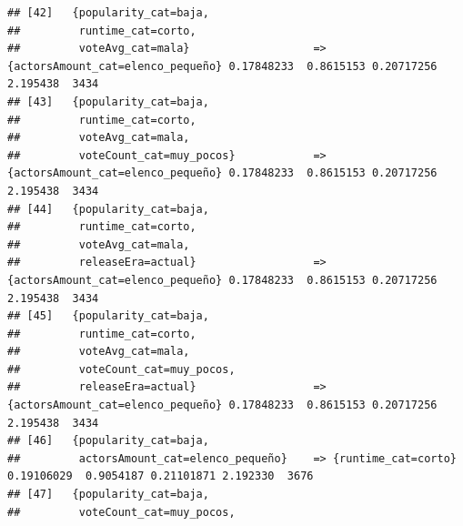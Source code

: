 \documentclass[
]{article}
\begin{document}
\begin{verbatim}
## [42]   {popularity_cat=baja,                                                                                                    
##         runtime_cat=corto,                                                                                                      
##         voteAvg_cat=mala}                   => {actorsAmount_cat=elenco_pequeño} 0.17848233  0.8615153 0.20717256 2.195438  3434
## [43]   {popularity_cat=baja,                                                                                                    
##         runtime_cat=corto,                                                                                                      
##         voteAvg_cat=mala,                                                                                                       
##         voteCount_cat=muy_pocos}            => {actorsAmount_cat=elenco_pequeño} 0.17848233  0.8615153 0.20717256 2.195438  3434
## [44]   {popularity_cat=baja,                                                                                                    
##         runtime_cat=corto,                                                                                                      
##         voteAvg_cat=mala,                                                                                                       
##         releaseEra=actual}                  => {actorsAmount_cat=elenco_pequeño} 0.17848233  0.8615153 0.20717256 2.195438  3434
## [45]   {popularity_cat=baja,                                                                                                    
##         runtime_cat=corto,                                                                                                      
##         voteAvg_cat=mala,                                                                                                       
##         voteCount_cat=muy_pocos,                                                                                                
##         releaseEra=actual}                  => {actorsAmount_cat=elenco_pequeño} 0.17848233  0.8615153 0.20717256 2.195438  3434
## [46]   {popularity_cat=baja,                                                                                                    
##         actorsAmount_cat=elenco_pequeño}    => {runtime_cat=corto}               0.19106029  0.9054187 0.21101871 2.192330  3676
## [47]   {popularity_cat=baja,                                                                                                    
##         voteCount_cat=muy_pocos,                                                                                                

\end{verbatim}
\end{document}

